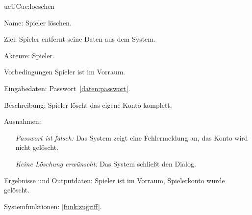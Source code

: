 \begin{description}[leftmargin=5em, style=sameline]
	\begin{lhp}{uc}{UC}{uc:loeschen}
		\item [Name:] Spieler löschen.
		\item [Ziel:] Spieler entfernt seine Daten aus dem System.
		\item [Akteure:] Spieler.
		\item [Vorbedingungen] Spieler ist im Vorraum.
		\item [Eingabedaten:] Passwort~\ref{daten:passwort}.
		\item [Beschreibung:] Spieler löscht das eigene Konto komplett.
		\item [Ausnahmen:] \hfill
			\begin{itemize} 
				\item[] \textit{Passwort ist falsch:} Das System zeigt eine Fehlermeldung an, das Konto wird nicht gelöscht.
				\item[] \textit{Keine Löschung erwünscht:} Das System schließt den Dialog.
				
			\end{itemize}
		\item [Ergebnisse und Outputdaten:] Spieler ist im Vorraum, Spielerkonto wurde gelöscht.	
		\item [Systemfunktionen:] \ref{funk:zugriff}.
	\end{lhp}

\end{description}